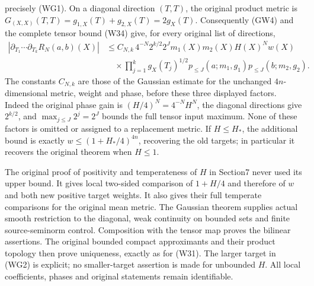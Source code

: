 \documentclass[
  11pt,
]{article}
\begin{document}
precisely (WG1). On a diagonal direction \((T,T)\), the original product
metric is \(G_{(X,X)}(T,T)=g_{1,X}(T)+g_{2,X}(T)=2g_X(T)\). Consequently
(GW4) and the complete tensor bound (W34) give, for every original list
of directions, \[
 \begin{aligned}
 |\partial_{T_1}\cdots\partial_{T_k}R_N(a,b)(X)|
 &\leq C_{N,k}\,4^{-N}2^{k/2}2^J
       m_1(X)m_2(X)H(X)^Nw(X)\\
 &\quad\times\prod_{j=1}^k g_X(T_j)^{1/2}
       p_{\leq J}(a;m_1,g_1)p_{\leq J}(b;m_2,g_2).
 \end{aligned}
 \tag{WG4}
\] The constants \(C_{N,k}\) are those of the Gaussian estimate for the
unchanged \(4n\)-dimensional metric, weight and phase, before these
three displayed factors. Indeed the original phase gain is
\((H/4)^N=4^{-N}H^N\), the diagonal directions give \(2^{k/2}\), and
\(\max_{j\leq J}2^j=2^J\) bounds the full tensor input maximum. None of
these factors is omitted or assigned to a replacement metric. If
\(H\leq H_*\), the additional bound is exactly \(w\leq(1+H_*/4)^{4n}\),
recovering the old targets; in particular it recovers the original
theorem when \(H\leq1\).

The original proof of positivity and temperateness of \(H\) in Section7
never used its upper bound. It gives local two-sided comparison of
\(1+H/4\) and therefore of \(w\) and both new positive target weights.
It also gives their full temperate comparisons for the original mean
metric. The Gaussian theorem supplies actual smooth restriction to the
diagonal, weak continuity on bounded sets and finite source-seminorm
control. Composition with the tensor map proves the bilinear assertions.
The original bounded compact approximants and their product topology
then prove uniqueness, exactly as for (W31). The larger target in (WG2)
is explicit; no smaller-target assertion is made for unbounded \(H\).
All local coefficients, phases and original statements remain
identifiable.
\end{document}
